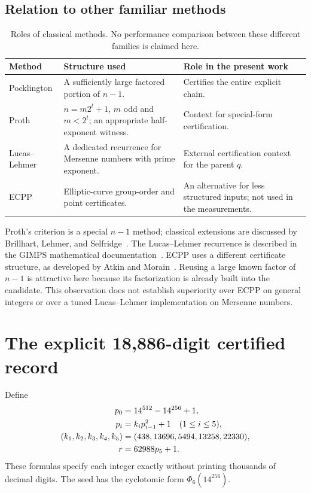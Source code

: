 \documentclass[11pt,a4paper]{article}
\theoremstyle{definition}
\begin{document}
\subsection{Relation to other familiar methods}

\begin{table}[htbp]
\centering\small
\caption{Roles of classical methods. No performance comparison between these
different families is claimed here.}
\label{tab:methods}
\begin{tabularx}{\linewidth}{@{}l X X@{}}
\toprule
Method & Structure used & Role in the present work\\
\midrule
Pocklington & A sufficiently large factored portion of $n-1$. & Certifies the entire explicit chain.\\
Proth & $n=m2^t+1$, $m$ odd and $m<2^t$; an appropriate half-exponent witness. & Context for special-form certification.\\
Lucas--Lehmer & A dedicated recurrence for Mersenne numbers with prime exponent. & External certification context for the parent $q$.\\
ECPP & Elliptic-curve group-order and point certificates. & An alternative for less structured inputs; not used in the measurements.\\
\bottomrule
\end{tabularx}
\end{table}

Proth's criterion is a special $n-1$ method; classical extensions are discussed
by Brillhart, Lehmer, and Selfridge~\cite{bls}. The Lucas--Lehmer recurrence
is described in the GIMPS mathematical documentation~\cite{gimpsmath}.
ECPP uses a different certificate
structure, as developed by Atkin and Morain~\cite{atkinmorain}. Reusing a
large known factor of $n-1$ is attractive here because its factorization is
already built into the candidate. This observation does not establish
superiority over ECPP on general integers or over a tuned Lucas--Lehmer
implementation on Mersenne numbers.

\section{The explicit 18,886-digit certified record}
\label{sec:record}

Define
\begin{align}
 p_0&=14^{512}-14^{256}+1,\label{eq:seed}\\
 p_i&=k_i p_{i-1}^2+1\quad(1\le i\le5),\label{eq:chain}\\
 (k_1,k_2,k_3,k_4,k_5)&=(438,13696,5494,13258,22330),\notag\\
 r&=62988p_5+1.\label{eq:record}
\end{align}
These formulas specify each integer exactly without printing thousands of
decimal digits. The seed has the cyclotomic form $\Phi_6(14^{256})$.
\end{document}
